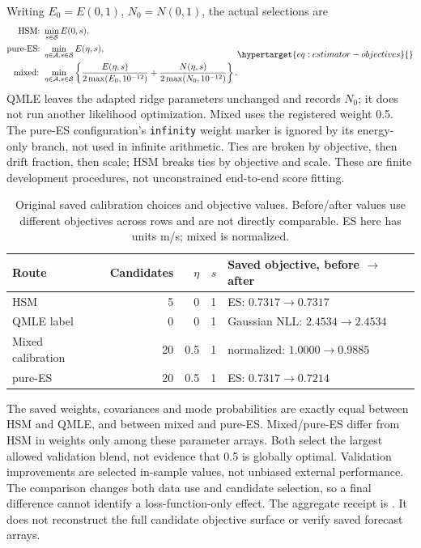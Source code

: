 Writing \(E_0=E(0,1)\), \(N_0=N(0,1)\), the actual selections are
\begin{equation}
\begin{aligned}
\text{HSM: }&\min_{s\in\mathcal S} E(0,s),\\
\text{pure-ES: }&\min_{\eta\in\mathcal A,s\in\mathcal S}E(\eta,s),\\
\text{mixed: }&\min_{\eta\in\mathcal A,s\in\mathcal S}
 \left\{\frac{E(\eta,s)}{2\max(E_0,10^{-12})}
       +\frac{N(\eta,s)}{2\max(N_0,10^{-12})}\right\}.
\end{aligned}
\label{eq:estimator-objectives}\hypertarget{eq:estimator-objectives}{}
\end{equation}
QMLE leaves the adapted ridge parameters unchanged and records \(N_0\);
it does not run another likelihood optimization. Mixed uses the registered
weight 0.5. The pure-ES configuration's \texttt{infinity} weight marker is
ignored by its energy-only branch, not used in infinite arithmetic.
Ties are broken by objective, then drift fraction, then scale; HSM breaks
ties by objective and scale. These are finite development procedures, not
unconstrained end-to-end score fitting.

\begin{table}[htbp]
\centering\small
\caption{Original saved calibration choices and objective values.
Before/after values use different objectives across rows and are not
directly comparable. ES here has units m/s; mixed is normalized.}
\label{tab:estimator-calibration}\hypertarget{tab:estimator-calibration}{}
\begin{tabular}{lrrrl}
\toprule
Route & Candidates & \(\eta\) & \(s\) & Saved objective, before \(\to\) after\\
\midrule
HSM & 5 & 0 & 1 & ES: \(0.7317\to0.7317\)\\
QMLE label & 0 & 0 & 1 & Gaussian NLL: \(2.4534\to2.4534\)\\
Mixed calibration & 20 & 0.5 & 1 & normalized: \(1.0000\to0.9885\)\\
pure-ES & 20 & 0.5 & 1 & ES: \(0.7317\to0.7214\)\\
\bottomrule
\end{tabular}
\end{table}

The saved weights, covariances and mode probabilities are exactly equal
between HSM and QMLE, and between mixed and pure-ES. Mixed/pure-ES differ
from HSM in weights only among these parameter arrays. Both select the
largest allowed validation blend, not evidence that 0.5 is globally optimal.
Validation improvements are selected in-sample values, not unbiased external
performance. The comparison changes both data use and candidate selection,
so a final difference cannot identify a loss-function-only effect.
The aggregate receipt is
.
It does not reconstruct the full candidate objective surface or verify
saved forecast arrays.


